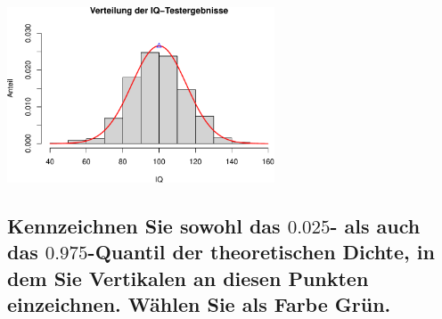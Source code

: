 \documentclass[12pt,a4paper]{article}
\begin{document}
\begin{center}\includegraphics[width=300px]{solution_3_files/figure-latex/unnamed-chunk-14-1} \end{center}

\subsection{\texorpdfstring{Kennzeichnen Sie sowohl das \(0.025\)- als
auch das \(0.975\)-Quantil der theoretischen Dichte, in dem Sie
Vertikalen an diesen Punkten einzeichnen. Wählen Sie als Farbe
Grün.}{Kennzeichnen Sie sowohl das 0.025- als auch das 0.975-Quantil der theoretischen Dichte, in dem Sie Vertikalen an diesen Punkten einzeichnen. Wählen Sie als Farbe Grün.}}\label{kennzeichnen-sie-sowohl-das-0.025--als-auch-das-0.975-quantil-der-theoretischen-dichte-in-dem-sie-vertikalen-an-diesen-punkten-einzeichnen.-wuxe4hlen-sie-als-farbe-gruxfcn.}
\end{document}
